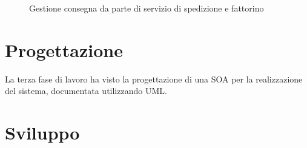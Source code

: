 \documentclass[11pt]{article} %
\begin{document}
\begin{figure}[!ht]
\begin{center}
\caption{Gestione consegna da parte di servizio di spedizione e fattorino}
\end{center}
\end{figure}

\clearpage

\section{Progettazione}

La terza fase di lavoro ha visto la progettazione di una SOA per la realizzazione del sistema, documentata utilizzando UML.

\clearpage

\section{Sviluppo}
\end{document}
